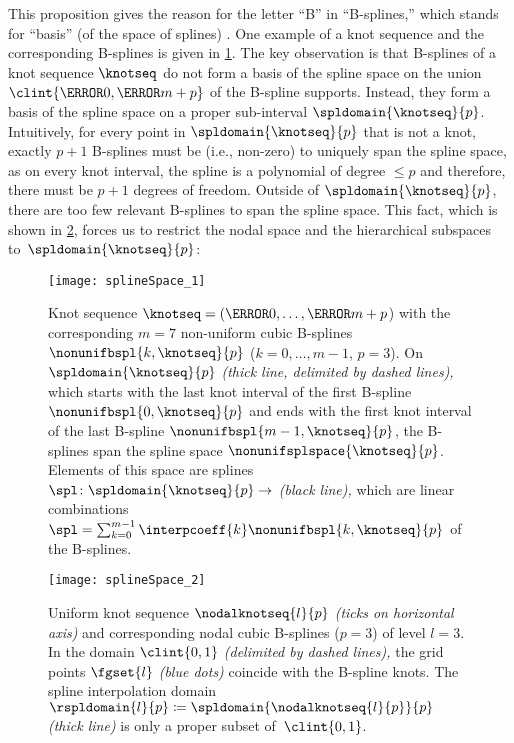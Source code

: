 This proposition gives the reason for the letter ``B'' in ``B-splines,''
which stands for ``basis'' (of the space of splines) \cite{Schoenberg67Spline}.
One example of a knot sequence and the corresponding B-splines is
given in \cref{fig:splineSpaceGeneral}.
The key observation is that B-splines of a knot sequence $\knotseq$
do not form a basis of the spline space on the union
$\clint{\knot{0}, \knot{m+p}}$ of the B-spline supports.
Instead, they form a basis of the spline space
on a proper sub-interval $\spldomain{\knotseq}{p}$.
Intuitively, for every point in $\spldomain{\knotseq}{p}$ that is not a knot,
exactly $p + 1$ B-splines must be  (i.e., non-zero)
to uniquely span the spline space,
as on every knot interval, the spline is a polynomial of degree $\le p$
and therefore, there must be $p + 1$ degrees of freedom.
Outside of $\spldomain{\knotseq}{p}$, there are too few relevant B-splines
to span the spline space.
This fact,
which is shown in \cref{fig:splineSpaceUniform},
forces us to restrict the nodal space and the hierarchical subspaces
to~$\spldomain{\knotseq}{p}$:

\begin{figure}
  \texttt{[image: splineSpace\_1]}%
  \caption[%
    Non-uniform B-splines with knot sequence and interpolation domain%
  ]{%
    Knot sequence $\knotseq = (\knot{0}, \dotsc, \knot{m+p}$)
    with the corresponding $m = 7$ non-uniform cubic B-splines
    $\nonunifbspl{k,\knotseq}{p}$ ($k = 0, \dotsc, m - 1$, $p = 3$).
    On $\spldomain{\knotseq}{p}$ \emph{(thick line, delimited by dashed lines),}
    which starts with the last knot interval of the first B-spline
    $\nonunifbspl{0,\knotseq}{p}$
    and ends with the first knot interval of the last B-spline
    $\nonunifbspl{m-1,\knotseq}{p}$,
    the B-splines span the spline space $\nonunifsplspace{\knotseq}{p}$.
    Elements of this space are splines $\spl\colon \spldomain{\knotseq}{p} \to \real$
    \emph{(black line),}
    which are linear combinations
    $\spl = \sum_{k=0}^{m-1} \interpcoeff{k} \nonunifbspl{k,\knotseq}{p}$
    of the B-splines.%
  }%
  \label{fig:splineSpaceGeneral}%
\end{figure}

\begin{figure}
  \texttt{[image: splineSpace\_2]}%
  \caption[%
    Uniform nodal B-splines and knot sequence%
  ]{%
    Uniform knot sequence $\nodalknotseq{l}{p}$ \emph{(ticks on horizontal axis)}
    and corresponding nodal cubic B-splines ($p = 3$) of level $l = 3$.
    In the domain $\clint{0, 1}$ \emph{(delimited by dashed lines),}
    the grid points $\fgset{l}$ \emph{\textcolor{mittelblau}{(blue dots)}}
    coincide with the B-spline knots.
    The spline interpolation domain
    $\rspldomain{l}{p} \ceq \spldomain{\nodalknotseq{l}{p}}{p}$
    \emph{(thick line)}
    is only a proper subset of~$\clint{0, 1}$.%
  }%
  \label{fig:splineSpaceUniform}%
\end{figure}

